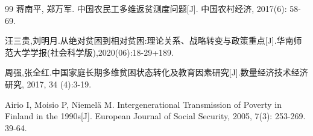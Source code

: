 \clearpage
\begin{thebibliography}{99} \xiaosi \song
  \setlength{\itemsep}{-0.5ex}
  蒋南平, 郑万军. 中国农民工多维返贫测度问题[J]. 中国农村经济, 2017(6): 58-69.

  汪三贵,刘明月.从绝对贫困到相对贫困:理论关系、战略转变与政策重点[J].华南师范大学学报(社会科学版),2020(06):18-29+189.

  周强,张全红.中国家庭长期多维贫困状态转化及教育因素研究[J].数量经济技术经济研究, 2017, 34 (4):3-19.

  Airio I, Moisio P, Niemelä M. Intergenerational Transmission of Poverty in
  Finland in the 1990s[J]. European Journal of Social Security, 2005, 7(3):
  253-269. 39-64.
\end{thebibliography}
